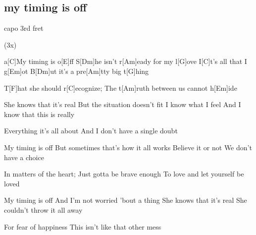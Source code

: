 \subsection*{my timing is off   }
\begin{guitar}
capo 3rd fret

 (3x)



a[C]My timing is o[E]ff
S[Dm]he isn't r[Am]eady for my l[G]ove
I[C]t's all that I g[Em]ot
B[Dm]ut it's a pre[Am]tty big t[G]hing



T[F]hat she should r[C]ecognize;
The t[Am]ruth between us cannot h[Em]ide\qquad[G]{}



She knows that it's real
But the situation doesn't fit
I know what I feel
And I know that this is really



Everything it's all about
And I don't have a single doubt



My timing is off
But sometimes that's how it all works
Believe it or not
We don't have a choice



In matters of the heart;
Just gotta be brave enough
To love and let yourself be loved



My timing is off
And I'm not worried 'bout a thing
She knows that it's real
She couldn't throw it all away



For fear of happiness
This isn't like that other mess
\end{guitar}
